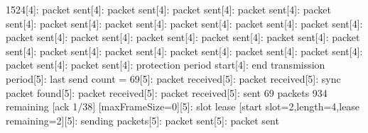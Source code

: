 \documentclass[parskip]{cs4rep}
\begin{document}
1524[4]: packet sent[4]: packet sent[4]: packet sent[4]: packet sent[4]: packet sent[4]: packet sent[4]: packet sent[4]: packet sent[4]: packet sent[4]: packet sent[4]: packet sent[4]: packet sent[4]: packet sent[4]: packet sent[4]: packet sent[4]: packet sent[4]: packet sent[4]: packet sent[4]: packet sent[4]: packet sent[4]: packet sent[4]: packet sent[4]: packet sent[4]: protection period start[4]: end transmission period[5]: last send count = 69[5]: packet received[5]: packet received[5]: sync packet found[5]: packet received[5]: packet received[5]: sent 69 packets 934 remaining [ack 1/38] [maxFrameSize=0][5]: slot lease [start slot=2,length=4,lease remaining=2][5]: sending packets[5]: packet sent[5]: packet sent\newline
\end{document}
